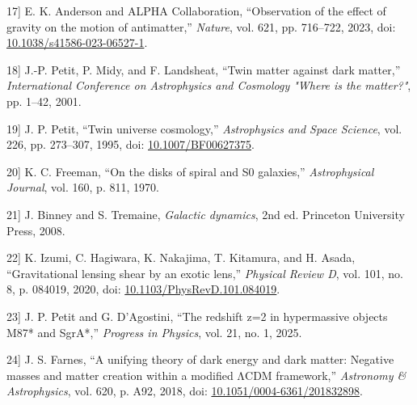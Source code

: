 \documentclass[11pt]{article}
\newlength{\cslhangindent}
\newenvironment{CSLReferences}[2]%
{\par
\noindent\setlength{\parindent}{0pt}}%
{\par}
\newcommand{\CSLLeftMargin}[1]{\hspace*{\cslhangindent}#1}
\newcommand{\CSLRightInline}[1]{#1}
\begin{document}
\begin{CSLReferences}{0}{0}
\leavevmode{}%
\CSLLeftMargin{{[}17{]} }
\CSLRightInline{E. K. Anderson and ALPHA Collaboration, {``Observation
of the effect of gravity on the motion of antimatter,''} \emph{Nature},
vol. 621, pp. 716--722, 2023, doi:
\href{https://doi.org/10.1038/s41586-023-06527-1}{10.1038/s41586-023-06527-1}.}

\leavevmode{}%
\CSLLeftMargin{{[}18{]} }
\CSLRightInline{J.-P. Petit, P. Midy, and F. Landsheat, {``Twin matter
against dark matter,''} \emph{International Conference on Astrophysics
and Cosmology "Where is the matter?"}, pp. 1--42, 2001.}

\leavevmode{}%
\CSLLeftMargin{{[}19{]} }
\CSLRightInline{J. P. Petit, {``Twin universe cosmology,''}
\emph{Astrophysics and Space Science}, vol. 226, pp. 273--307, 1995,
doi: \href{https://doi.org/10.1007/BF00627375}{10.1007/BF00627375}.}

\leavevmode{}%
\CSLLeftMargin{{[}20{]} }
\CSLRightInline{K. C. Freeman, {``On the disks of spiral and S0
galaxies,''} \emph{Astrophysical Journal}, vol. 160, p. 811, 1970.}

\leavevmode{}%
\CSLLeftMargin{{[}21{]} }
\CSLRightInline{J. Binney and S. Tremaine, \emph{Galactic dynamics}, 2nd
ed. Princeton University Press, 2008.}

\leavevmode{}%
\CSLLeftMargin{{[}22{]} }
\CSLRightInline{K. Izumi, C. Hagiwara, K. Nakajima, T. Kitamura, and H.
Asada, {``Gravitational lensing shear by an exotic lens,''}
\emph{Physical Review D}, vol. 101, no. 8, p. 084019, 2020, doi:
\href{https://doi.org/10.1103/PhysRevD.101.084019}{10.1103/PhysRevD.101.084019}.}

\leavevmode{}%
\CSLLeftMargin{{[}23{]} }
\CSLRightInline{J. P. Petit and G. D'Agostini, {``The redshift z=2 in
hypermassive objects M87* and SgrA*,''} \emph{Progress in Physics}, vol.
21, no. 1, 2025.}

\leavevmode{}%
\CSLLeftMargin{{[}24{]} }
\CSLRightInline{J. S. Farnes, {``A unifying theory of dark energy and
dark matter: Negative masses and matter creation within a modified ΛCDM
framework,''} \emph{Astronomy \& Astrophysics}, vol. 620, p. A92, 2018,
doi:
\href{https://doi.org/10.1051/0004-6361/201832898}{10.1051/0004-6361/201832898}.}


\end{CSLReferences}
\end{document}
